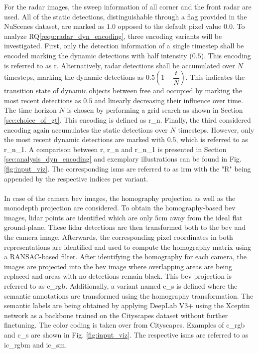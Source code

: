 For the radar images, the sweep information of all corner and the front radar are used. All of the static detections, distinguishable through a flag provided in the NuScenes dataset, are marked as $1.0$ opposed to the default pixel value $0.0$. To analyze RQ\ref{requ:radar_dyn_encoding}, three encoding variants will be investigated. First, only the detection information of a single timestep shall be encoded marking the dynamic detections with half intensity ($0.5$). This encoding is referred to as \gls{r}. Alternatively, radar detections shall be accumulated over $N$ timesteps, marking the dynamic detections as $0.5(1-\dfrac{t}{N})$. This indicates the transition state of dynamic objects between free and occupied by marking the most recent detections as $0.5$ and linearly decreasing their influence over time. The time horizon $N$ is chosen by performing a grid search as shown in Section \ref{sec:choice_of_gt}. This encoding is defined as \gls{r_n}. Finally, the third considered encoding again accumulates the static detections over $N$ timesteps. However, only the most recent dynamic detections are marked with $0.5$, which is referred to as \gls{r_n_1}. A comparison between \gls{r}, \gls{r_n} and \gls{r_n_1} is presented in Section \ref{sec:analysis_dyn_encoding} and exemplary illustrations can be found in Fig. \ref{fig:input_viz}. The corresponding \gls{ism}s are referred to as \gls{irm} with the "R" being appended by the respective indices per variant.
\\\\
In case of the camera \gls{bev} images, the homography projection as well as the \gls{monodepth} projection are considered. To obtain the homography-based \gls{bev} images, lidar points are identified which are only $5$cm away from the ideal flat ground-plane. These lidar detections are then transformed both to the \gls{bev} and the camera image. Afterwards, the corresponding pixel coordinates in both representations are identified and used to compute the homography matrix using a RANSAC-based filter. After identifying the homography for each camera, the images are projected into the \gls{bev} image where overlapping areas are being replaced and areas with no detections remain black. This \gls{bev} projection is referred to as \gls{c_rgb}. Additionally, a variant named \gls{c_s} is defined where the semantic annotations are transformed using the homography transformation. The semantic labels are being obtained by applying DeepLab V3+ \cite{deeplabv3plus2018} using the Xceptin network \cite{chollet2017xception} as a backbone trained on the Cityscapes dataset \cite{cordts2016cityscapes} without further finetuning. The color coding is taken over from Cityscapes. Examples of \gls{c_rgb} and \gls{c_s} are shown in Fig. \ref{fig:input_viz}. The respective \gls{ism}s are referred to as \gls{ic_rgbm} and \gls{ic_sm}.
